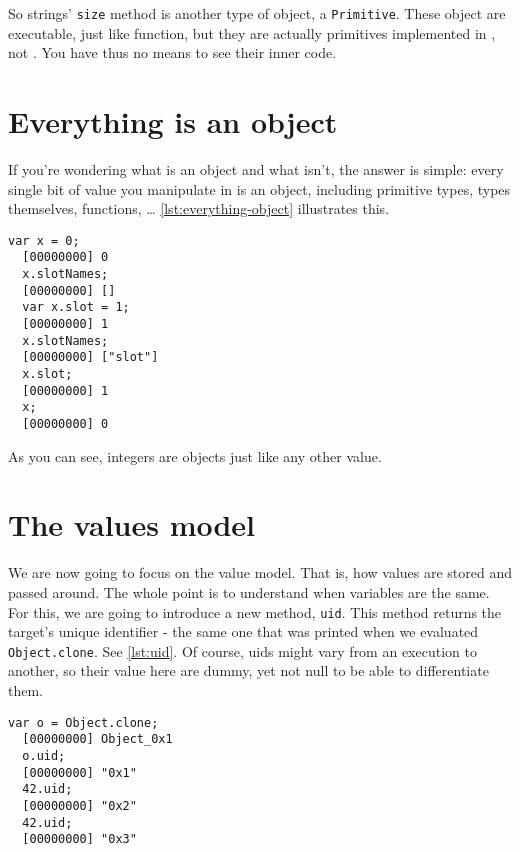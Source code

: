 \documentclass[openright,twoside,12pt]{report}
\begin{document}
So strings' \texttt{size} method is another type of object, a
\texttt{Primitive}. These object are executable, just like function,
but they are actually primitives implemented in \Cxx, not \urbi. You
have thus no means to see their inner code.

\section{Everything is an object}

If you're wondering what is an object and what isn't, the answer is
simple: every single bit of value you manipulate in \urbi is an
object, including primitive types, types themselves, functions, \ldots
\autoref{lst:everything-object} illustrates this.

\begin{lstlisting}[caption=Everything is an object,
  label=lst:everything-object]
  var x = 0;
  [00000000] 0
  x.slotNames;
  [00000000] []
  var x.slot = 1;
  [00000000] 1
  x.slotNames;
  [00000000] ["slot"]
  x.slot;
  [00000000] 1
  x;
  [00000000] 0
\end{lstlisting}

As you can see, integers are objects just like any other value.

\section{The \urbi values model}

We are now going to focus on the \urbi value model. That is, how
values are stored and passed around. The whole point is to understand
when variables are the same. For this, we are going to introduce a new
method, \texttt{uid}. This method returns the target's unique
identifier - the same one that was printed when we evaluated
\lstinline|Object.clone|. See \autoref{lst:uid}. Of course, uids might vary
from an execution to another, so their value here are dummy, yet not
null to be able to differentiate them.

\begin{lstlisting}[caption=Uids, label=lst:uid]
  var o = Object.clone;
  [00000000] Object_0x1
  o.uid;
  [00000000] "0x1"
  42.uid;
  [00000000] "0x2"
  42.uid;
  [00000000] "0x3"
\end{lstlisting}
\end{document}
